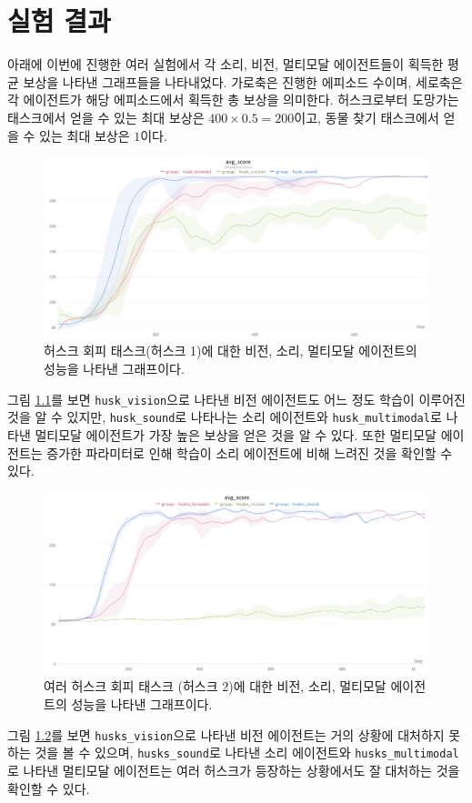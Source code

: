 \documentclass[oneside, under, ko]{snuthesis}
\begin{document}
\chapter{실험 결과}
아래에 이번에 진행한 여러 실험에서 각 소리, 비전, 멀티모달 에이전트들이 획득한 평균 보상을 나타낸 그래프들을 나타내었다. 가로축은 진행한 에피소드 수이며, 세로축은 각 에이전트가 해당 에피소드에서 획득한 총 보상을 의미한다. 허스크로부터 도망가는 태스크에서 얻을 수 있는 최대 보상은 $400 \times 0.5 = 200 $이고, 동물 찾기 태스크에서 얻을 수 있는 최대 보상은 $1$이다.
\begin{figure}[H]
    \centering
    \includegraphics[width=\textwidth]{husk.png}
    \caption{허스크 회피 태스크(허스크 1)에 대한 비전, 소리, 멀티모달 에이전트의 성능을 나타낸 그래프이다.}
    \label{fig:husk}
\end{figure}
그림 \ref{fig:husk}를 보면 \lstinline{husk_vision}으로 나타낸 비전 에이전트도 어느 정도 학습이 이루어진 것을 알 수 있지만, \lstinline{husk_sound}로 나타나는 소리 에이전트와 \lstinline{husk_multimodal}로 나타낸 멀티모달 에이전트가 가장 높은 보상을 얻은 것을 알 수 있다. 또한 멀티모달 에이전트는 증가한 파라미터로 인해 학습이 소리 에이전트에 비해 느려진 것을 확인할 수 있다.

\begin{figure}[H]
    \centering
    \includegraphics[width=\textwidth]{husks.png}
    \caption{여러 허스크 회피 태스크 (허스크 2)에 대한 비전, 소리, 멀티모달 에이전트의 성능을 나타낸 그래프이다. }
    \label{fig:husks}
\end{figure}
그림 \ref{fig:husks}를 보면 \lstinline{husks_vision}으로 나타낸 비전 에이전트는 거의 상황에 대처하지 못하는 것을 볼 수 있으며, \lstinline{husks_sound}로 나타낸 소리 에이전트와 \lstinline{husks_multimodal}로 나타낸 멀티모달 에이전트는 여러 허스크가 등장하는 상황에서도 잘 대처하는 것을 확인할 수 있다.
\end{document}

